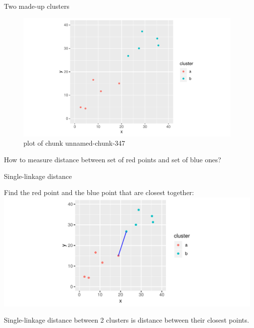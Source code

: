 \documentclass[ignorenonframetext,]{beamer}
\begin{document}
\begin{frame}{Two made-up clusters}
\protect\hypertarget{two-made-up-clusters}{}

\begin{figure}
\centering
\includegraphics{figure/unnamed-chunk-347-1.pdf}
\caption{plot of chunk unnamed-chunk-347}
\end{figure}

How to measure distance between set of red points and set of blue ones?

\end{frame}

\begin{frame}{Single-linkage distance}
\protect\hypertarget{single-linkage-distance}{}

Find the red point and the blue point that are closest together:
\includegraphics{figure/unnamed-chunk-348-1.pdf}

Single-linkage distance between 2 clusters is distance between their
closest points.

\end{frame}
\end{document}
